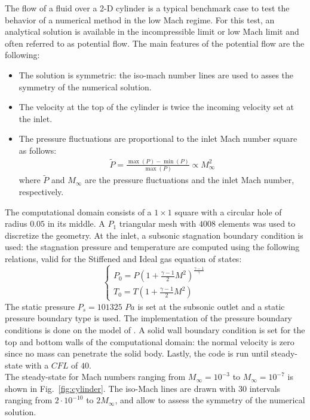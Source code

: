 \documentclass[preprint,10pt]{elsarticle}
\newcommand{\fig}[1]{Fig.~\ref{#1}}                      %
\begin{document}
The flow of a fluid over a 2-D cylinder is a typical benchmark case to test the behavior of a numerical method in the low Mach regime. For this test, an analytical solution is available in the incompressible limit or low Mach limit and often referred to as potential flow. The main features of the potential flow are the following:
%
\begin{itemize}
\item The solution is symmetric: the iso-mach number lines are used to asses the symmetry of the numerical solution.
\item The velocity at the top of the cylinder is twice the incoming velocity set at the inlet.
\item The pressure fluctuations are proportional to the inlet Mach number square as follows: 
\begin{eqnarray}
\tilde{P} = \frac{\max(P) - \min(P)}{\max(P)}  \propto M_\infty^2\nonumber
\end{eqnarray}
where $\tilde{P}$ and $M_\infty$ are the pressure fluctuations and the inlet Mach number, respectively.
\end{itemize}
%
The computational domain consists of a $1\times 1$ square with a circular hole of radius $0.05$ in its middle. A $P_1$ triangular mesh with $4008$ elements was used to discretize the geometry. At the inlet, a subsonic stagnation boundary condition is used: the stagnation pressure and temperature are computed using the following relations, valid for the Stiffened and Ideal gas equation of states:
%
\begin{equation}
\label{eq:stagnation_relations}
\left\{
\begin{array}{l}
P_0 = P\left( 1 + \frac{\gamma-1}{2} M^2 \right)^{\frac{\gamma-1}{\gamma}} \\
T_0 = T\left( 1 + \frac{\gamma-1}{2} M^2 \right)
\end{array}
\right.
\end{equation}
%
The static pressure $P_s = 101325$ $Pa$ is set at the subsonic outlet and a static pressure boundary type is used. The implementation of the pressure boundary conditions is done on the model of \cite{SEM}. A solid wall boundary condition is set for the top and bottom walls of the computational domain: the normal velocity is zero since no mass can penetrate the solid body. Lastly, the code is run until steady-state with a $CFL$ of $40$.\\
The steady-state for Mach numbers ranging from $M_\infty = 10^{-3}$ to $M_{\infty} = 10^{-7}$ is shown in \fig{fig:cylinder}. The iso-Mach lines are drawn with $30$ intervals ranging from $2 \cdot 10^{-10}$ to $2M_\infty$, and allow to assess the symmetry of the numerical solution.
\end{document}
